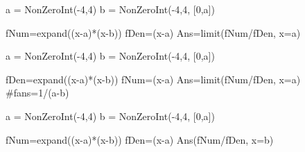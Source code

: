 



\begin{sagesilent}
a = NonZeroInt(-4,4)
b = NonZeroInt(-4,4, [0,a])

fNum=expand((x-a)*(x-b))
fDen=(x-a)
Ans=limit(fNum/fDen, x=a)
\end{sagesilent}



\begin{sagesilent}
a = NonZeroInt(-4,4)
b = NonZeroInt(-4,4, [0,a])

fDen=expand((x-a)*(x-b))
fNum=(x-a)
Ans=limit(fNum/fDen, x=a)
#fans=1/(a-b)
\end{sagesilent}




\begin{sagesilent}
a = NonZeroInt(-4,4)
b = NonZeroInt(-4,4, [0,a])

fNum=expand((x-a)*(x-b))
fDen=(x-a)
Ans(fNum/fDen, x=b)
\end{sagesilent}

